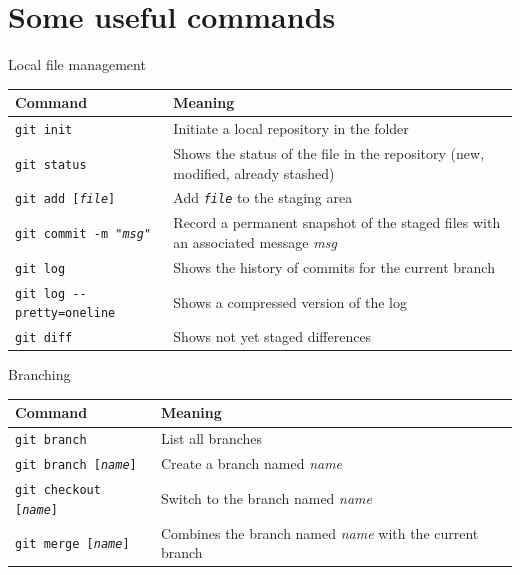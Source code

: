 \documentclass[aspectratio=169]{beamer}
\newcommand{\cd}[1]{\texttt{#1}}
\begin{document}
\section{Some useful commands}
\begin{frame}{Local file management}
\begin{table}
    \scriptsize
    \centering
    \begin{tabular}{p{}p{}}
        \toprule
        \alert{Command}	&	\alert{Meaning}\\
        \midrule
        \cd{git init}	&	Initiate a local repository in the folder\\
        \cd{git status}	&	Shows the status of the file in the repository (new, modified, already stashed)\\
        \cd{git add [\textit{file}]}	&	Add \cd{\textit{file}} to the staging area\\
        \cd{git commit -m "\textit{msg}"} & Record a permanent snapshot of the staged files with an associated message \textit{msg}\\
        \cd{git log}	&	Shows the history of commits for the current branch\\
        \cd{git log -{}-pretty=oneline}	&	Shows a compressed version of the log\\
        \cd{git diff}	&	Shows not yet staged differences\\
        \bottomrule
    \end{tabular}
\end{table}
\end{frame}

\begin{frame}{Branching}
\begin{table}
    \scriptsize
    \centering
    \begin{tabular}{p{}p{}}
        \toprule
        \alert{Command}	&	\alert{Meaning}\\
        \midrule
        \cd{git branch}	&	List all branches\\
        \cd{git branch [\textit{name}]}	&	Create a branch named \textit{name}\\
        \cd{git checkout [\textit{name}]}	&	Switch to the branch named \textit{name}\\
        \cd{git merge [\textit{name}]}	&	Combines the branch named \textit{name} with the current branch\\
        \bottomrule
        \end{tabular}
    \end{table}
\end{frame}
\end{document}
